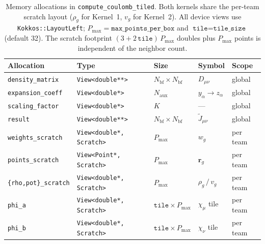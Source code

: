 \documentclass{article}
\begin{document}
\begin{table}[H]
  \centering
  {\small
    \begin{tabular}{@{}l l l l l@{}}
      \toprule
      Allocation & Type & Size & Symbol & Scope \\
      \midrule
      \texttt{density\_matrix}      & \texttt{View<double**>}
      & $N_\text{bf}\times N_\text{bf}$   & $D_{\mu\nu}$ & global \\
      \texttt{expansion\_coeff}     & \texttt{View<double*>}
      & $N_\text{aux}$                    & $y_\alpha\!\to\!z_\alpha$
      & global \\
      \texttt{scaling\_factor}      & \texttt{View<double*>}
      & $K$                               & ---          & global \\
      \texttt{result}               & \texttt{View<double**>}
      & $N_\text{bf}\times N_\text{bf}$   & $\tilde J_{\mu\nu}$ & global \\
      \texttt{weights\_scratch}     & \texttt{View<double*, Scratch>}
      & $P_\text{max}$                    & $w_g$        & per team \\
      \texttt{points\_scratch}      & \texttt{View<Point*, Scratch>}
      & $P_\text{max}$                    & $\mathbf r_g$ & per team \\
      \texttt{\{rho,pot\}\_scratch} & \texttt{View<double*, Scratch>}
      & $P_\text{max}$                    & $\rho_g\,/\,v_g$ & per team \\
      \texttt{phi\_a}               & \texttt{View<double*, Scratch>}
      & $\texttt{tile}\times P_\text{max}$ & $\chi_\mu$ tile & per team \\
      \texttt{phi\_b}               & \texttt{View<double*, Scratch>}
      & $\texttt{tile}\times P_\text{max}$ & $\chi_\nu$ tile & per team \\
      \bottomrule
  \end{tabular}}
  \caption{Memory allocations in \texttt{compute\_coulomb\_tiled}. Both
    kernels share the per-team scratch layout ($\rho_g$ for Kernel~1,
    $v_g$ for Kernel~2). All device views use \texttt{Kokkos::LayoutLeft};
    $P_\text{max}=\texttt{max\_points\_per\_box}$ and
    $\texttt{tile}=\texttt{tile\_size}$ (default 32). The scratch
    footprint $(3+2\,\texttt{tile})\,P_\text{max}$ doubles plus
  $P_\text{max}$ points is independent of the neighbor count.}
  \label{tab:tiled_rij_memory}
\end{table}
\end{document}
